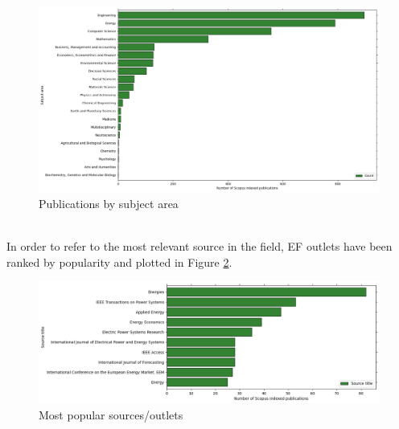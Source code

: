 \begin{figure}
  \includegraphics[width=\textwidth]{images/subject_area.png}
  \caption{Publications by subject area}
  \label{fig:subject_area}
\end{figure}
\\
In order to refer to the most relevant source in the field, EF outlets have been ranked by popularity and plotted in Figure \ref{fig:src_title}.
\begin{figure}
  \includegraphics[width=\textwidth]{images/src_title.png}
  \caption{Most popular sources/outlets}
  \label{fig:src_title}
\end{figure}
\\

